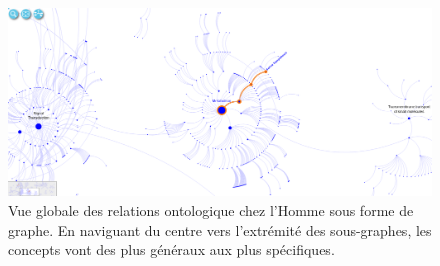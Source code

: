 \begin{refsegment}
    \begin{shadedfigure}[H]
        \begin{subfigure}[t]{.5\textwidth}
            \centering
            \includegraphics[angle=90,origin=c,width=\textwidth]{img/reactome_homo_sapiens_metabolism.png}
            \caption{ Vue globale des relations ontologique chez l'Homme sous forme de graphe. En naviguant du centre vers l'extrémité des sous-graphes, les concepts vont des plus généraux aux plus spécifiques. }
            \label{fig:reactome_metabolism}
        \end{subfigure}
    \hfill
    \begin{subfigure}[t]{.45\textwidth}
        \centering

\end{subfigure}
\end{shadedfigure}
\end{refsegment}
